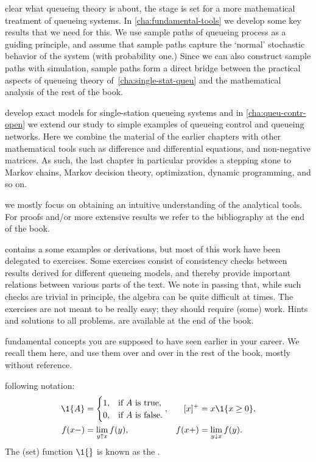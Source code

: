 \documentclass[queueing_book]{subfiles}
\begin{document}
 clear what queueing theory is about, the stage is set for a more mathematical treatment of queueing systems.
In \cref{cha:fundamental-tools} we develop some key results that we need for this.
We use sample paths of queueing process as a guiding principle, and assume that sample paths capture the `normal' stochastic behavior of the system (with probability one.)
Since we can also construct sample paths with simulation, sample paths form a direct bridge between the practical aspects of queueing theory of~\cref{cha:single-stat-queu} and the mathematical analysis of the rest of the book.


 develop exact models for single-station queueing systems and in \cref{cha:queu-contr-open} we extend our study to simple examples of queueing control and queueing networks.
Here we combine the material of the earlier chapters with other mathematical tools such as difference and differential equations, and non-negative matrices.
As such, the last chapter in particular provides a stepping stone to Markov chains, Markov decision theory, optimization, dynamic programming, and so on.

 we mostly focus on obtaining an intuitive understanding of the analytical tools.
For proofs and/or more extensive results we refer to the bibliography at the end of the book.


 contains a some examples or derivations, but most of this work have been delegated to exercises.
Some exercises consist of consistency checks between results derived for different queueing models, and thereby provide important relations between various parts of the text.
We note in passing that, while such checks are trivial in principle, the algebra can be quite difficult at times.
The exercises are not meant to be really easy; they should require (some) work.
Hints and solutions to all problems.
are available at the end of the book.




 fundamental concepts you are supposed to have seen earlier in your career.
We recall them here, and use them over and over in the rest of the book, mostly without reference. 

 following notation:
 \begin{align*}
 \1{A} &=
 \begin{cases}
 1, & \text{if $A$ is true}, \\
 0, & \text{if $A$ is false}.
 \end{cases},
& [x]^+ &= x \1{x\geq 0}, \\
 f(x-) &= \lim_{y\uparrow x} f(y), &
 f(x+) &= \lim_{y\downarrow x} f(y).
\end{align*}
The (set) function $\1{}$ is known as the .
\end{document}

